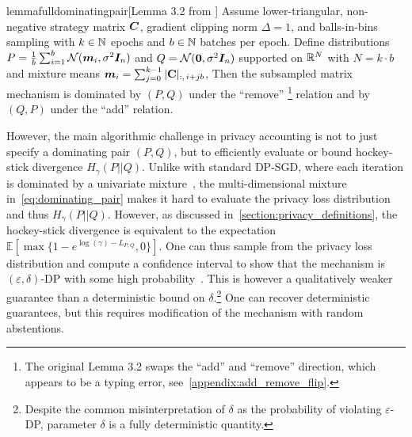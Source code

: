 \documentclass{article}
\theoremstyle{plain}
\theoremstyle{definition}
\theoremstyle{remark}
\renewcommand{\epsilon}{\varepsilon}
\begin{document}
\begin{restatable}{lemma}{fulldominatingpair}[Lemma 3.2 from \citet{choquette2024near}]
\label{lem:dominating_pair}
Assume lower-triangular, non-negative strategy matrix ${\bm{C}}$, gradient clipping norm $\Delta=1$, and balls-in-bins sampling with $k \in {\mathbb{N}}$ epochs and $b \in {\mathbb{N}}$ batches per epoch. 
Define distributions $P = \frac{1}{b}\sum_{i=1}^{b} \mathcal{N}({\bm{m}}_i, \sigma^2 {\bm{I}}_n)$
and $Q = \mathcal{N}({\bm{0}}, \sigma^2 {\bm{I}}_n)$ supported on ${\mathbb{R}}^{N}$
with $N = k \cdot b$ and mixture means
\label{eq:dominating_pair}
${\bm{m}}_i = \sum_{j = 0}^{k - 1} |\mathbf{C}|_{:,\, i + jb}$,
Then the subsampled matrix mechanism is dominated by $(P,Q)$ under the ``remove'' \footnote{The original Lemma 3.2 swaps the ``add'' and ``remove'' direction, which appears to be a typing error, see~\cref{appendix:add_remove_flip}.} relation and by
$(Q,P)$ under the ``add'' relation.
\end{restatable}
However, the main algorithmic challenge in privacy accounting is not to just specify a dominating pair $(P,Q)$, but to efficiently evaluate or bound hockey-stick divergence $H_\gamma(P || Q)$. Unlike with standard DP-SGD, where each iteration is dominated by a univariate mixture~\cite{zhu2022optimal},
the multi-dimensional mixture in~\cref{eq:dominating_pair} makes it hard to evaluate the privacy loss distribution and thus $H_\gamma(P || Q)$.
However, as discussed in~\cref{section:privacy_definitions}, the hockey-stick divergence 
is equivalent to the expectation $\mathbb{E}\left[\max\{1 - e^{\log(\gamma) - L_{P,Q}}, 0\}\right]$.
One can thus sample from the privacy loss distribution 
and compute a confidence interval to show that the mechanism is $(\epsilon,\delta)$-DP with some high probability~\cite{wang2023randomized}.
This is however a qualitatively weaker guarantee than a deterministic bound on $\delta$.\footnote{Despite the common misinterpretation of $\delta$ as the probability of violating $\epsilon$-DP,
parameter $\delta$ is a fully deterministic quantity.}
One can recover deterministic guarantees, but this requires modification of the mechanism with random abstentions.

\end{document}
